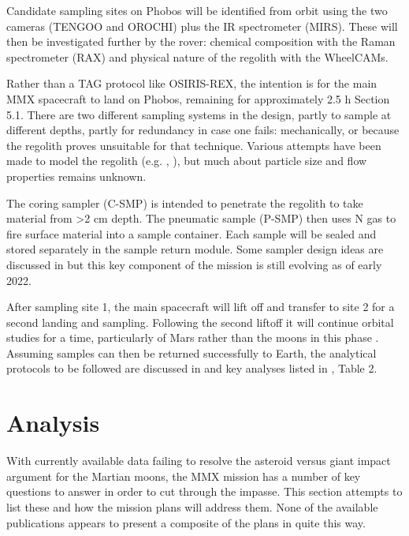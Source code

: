 Candidate sampling sites on Phobos will be identified from orbit using the two cameras (TENGOO and OROCHI) plus the IR spectrometer (MIRS). These will then be investigated further by the rover: chemical composition with the Raman spectrometer (RAX) and physical nature of the regolith with the WheelCAMs.

Rather than a TAG protocol like OSIRIS-REX, the intention is for the main MMX spacecraft to land on Phobos, remaining for approximately 2.5 h \citep{kawakatsu_preliminary_2022}{ Section 5.1}. There are two different sampling systems in the design, partly to sample at different depths, partly for redundancy in case one fails: mechanically, or because the regolith proves unsuitable for that technique. Various attempts have been made to model the regolith (e.g. \citet{miyamoto_surface_2021}, \citet{sunday_influence_2022}), but much about particle size and flow properties remains unknown.

The coring sampler (C-SMP) is intended to penetrate the regolith to take material from >2 cm depth. The pneumatic sample (P-SMP) then uses N gas to fire surface material into a sample container. Each sample will be sealed and stored separately in the sample return module. Some sampler design ideas are discussed in \citet{kawakatsu_preliminary_2022} but this key component of the mission is still evolving as of early 2022.

After sampling site 1, the main spacecraft will lift off and transfer to site 2 for a second landing and sampling. Following the second liftoff it will continue orbital studies for a time, particularly of Mars rather than the moons in this phase \citep{ogohara_mars_2022}. Assuming samples can then be returned successfully to Earth, the analytical protocols to be followed are discussed in \citet{fujiya_analytical_2021} and key analyses listed in \citet{usui_importance_2020}, Table 2.

\section{Analysis}\label{section:abalysis}

With currently available data failing to resolve the asteroid versus giant impact argument for the Martian moons, the MMX mission has a number of key questions to answer in order to cut through the impasse. This section attempts to list these and how the mission plans will address them. None of the available publications appears to present a composite of the plans in quite this way.

